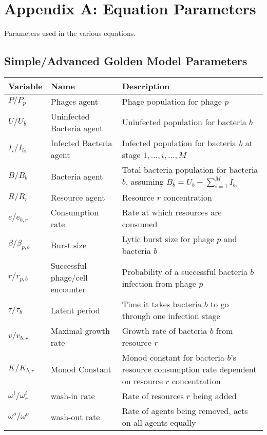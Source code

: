 \chapter{Appendix A: Equation Parameters}
\label{AppendixA}
Parameters used in the various equations. 

\section{Simple/Advanced Golden Model Parameters}
\begin{table}[h!]
    \small %
    \centering
    \begin{tabularx}{\textwidth}{l l X}
        \toprule
        \textbf{Variable} & \textbf{Name} & \textbf{Description} \\
        \midrule
        $P / P_p$ & Phages agent & Phage population for phage $p$ \\
        $U / U_b$ & Uninfected Bacteria agent & Uninfected population for bacteria $b$ \\
        $I_i / I_{b_i}$ & Infected Bacteria agent & Infected population for bacteria $b$ at stage $1, \dots, i, \dots, M$ \\
        $B / B_b$ & Bacteria agent & Total bacteria population for bacteria $b$, assuming $B_b = U_b + \sum_{i=1}^M I_{b_i}$ \\
        $R / R_r$ & Resource agent & Resource $r$ concentration\\
        $e / e_{b, r}$ & Consumption rate& Rate at which resources are consumed\\
        $\beta / \beta_{p, b}$ & Burst size & Lytic burst size for phage $p$ and bacteria $b$\\
        $r / r_{p, b}$ & Successful phage/cell encounter & Probability of a successful bacteria $b$ infection from phage $p$\\
        $\tau / \tau_{b}$ & Latent period & Time it takes bacteria $b$ to go through one infection stage\\
        $v / v_{b, r}$ & Maximal growth rate & Growth rate of bacteria $b$ from resource $r$ \\
        $K / K_{b, r}$ & Monod Constant & Monod constant for bacteria $b$'s resource consumption rate dependent on resource $r$ concentration\\
        $\omega^i / \omega^i_r$ & wash-in rate & Rate of resources $r$ being added\\
        $\omega^o / \omega^o$ & wash-out rate & Rate of agents being removed, acts on all agents equally\\

\end{tabularx}
\end{table}
